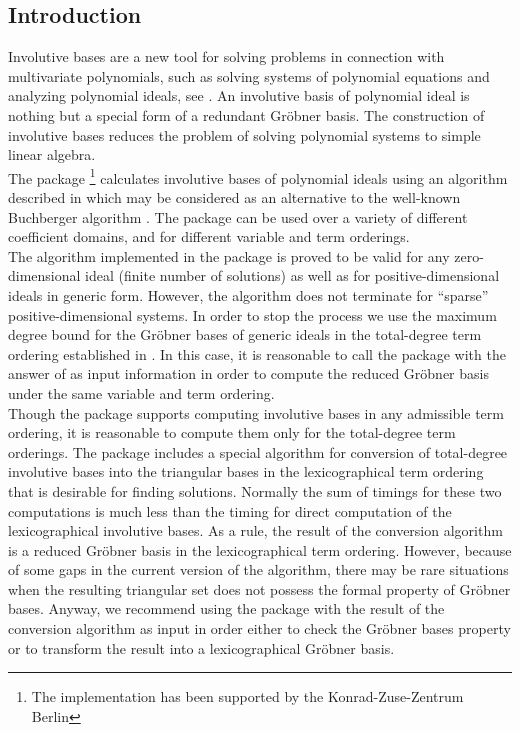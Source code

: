 

\subsection{Introduction}
Involutive bases are a new tool for solving problems in connection with
multivariate polynomials, such as solving systems of polynomial equations
and analyzing polynomial ideals, see \cite{ZharkovBlinkov:93}. An involutive basis of
polynomial ideal is nothing but a special form of a redundant Gr\"obner
basis. The construction of involutive bases reduces the problem of solving
polynomial systems to simple linear algebra.\\
The  package
\footnote{The \REDUCE implementation has been supported by
the Konrad-Zuse-Zentrum Berlin}
calculates involutive bases of polynomial ideals
using an algorithm described in \cite{ZharkovBlinkov:93}
which may be considered as an alternative to
the well-known Buchberger algorithm \cite{Buchberger:85}.
The package can be used over
a variety of different coefficient domains, and for different variable
and term orderings.\\
The algorithm implemented in the  package is proved
to be valid for any zero-dimensional ideal (finite number of solutions)
as well as for positive-dimensional ideals in generic form. However,
the algorithm does not terminate for ``sparse'' positive-dimensional systems.
In order to stop the process we use the maximum degree
bound for the Gr\"obner bases of generic ideals in the total-degree
term ordering established in \cite{Lazard:83}.
In this case, it is reasonable
to call the  package with the answer of  as input
information in order to compute the reduced Gr\"obner basis under the
same variable and term ordering.\\
Though the  package supports computing involutive bases in any
admissible term ordering,
it is reasonable to compute them only for the total-degree term
orderings. The package includes a special algorithm for conversion
of total-degree involutive bases into the triangular bases
in the lexicographical term ordering that is desirable for
finding solutions. Normally the sum of timings for these two
computations is much less than the timing for direct computation
of the lexicographical involutive bases. As a rule, the result
of the conversion algorithm is a reduced Gr\"obner basis in the
lexicographical term ordering. However, because of some gaps in
the current version of the algorithm,
there may be rare situations when the resulting triangular set
does not possess the formal property of Gr\"obner bases.
Anyway, we recommend using the  package with the result
of the conversion algorithm as input in order either to check
the Gr\"obner bases property or to transform the result into a
lexicographical Gr\"obner basis.
